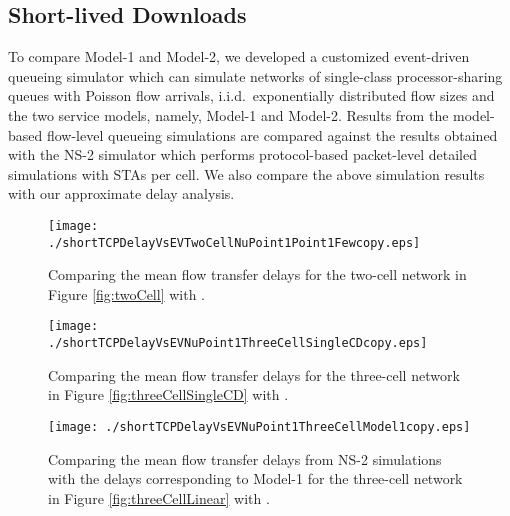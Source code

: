 \documentclass[10pt,a4paper,journal]{IEEEtran}
\theoremstyle{definition}
\theoremstyle{remark}
\theoremstyle{plain}
\begin{document}
\subsection{Short-lived Downloads}
\label{subsec:results-TCP-short}

To compare Model-1 and Model-2, we developed a customized event-driven queueing simulator which can simulate networks of single-class processor-sharing queues with Poisson flow arrivals, i.i.d.~exponentially distributed flow sizes and the two service models, namely, Model-1 and Model-2. Results from the model-based flow-level queueing simulations are compared against the results obtained with the NS-2 simulator \cite{wanet.ns2} which performs protocol-based packet-level detailed simulations with  STAs per cell. We also compare the above simulation results with our approximate delay analysis. 


\begin{figure}[tb]
  \centering
  \begin{minipage}{8.25cm}
  \begin{center}
    \texttt{[image: ./shortTCPDelayVsEVTwoCellNuPoint1Point1Fewcopy.eps]}
     \caption{Comparing the mean flow transfer delays for the two-cell
       network in Figure \ref{fig:twoCell} with . \label{fig:shortTCPDelayVsEVTwoCellNuPoint1Point1Few}}
     \vspace{3mm}
  \end{center}
  \end{minipage}
\begin{minipage}{8.25cm}
  \begin{center}
    \texttt{[image: ./shortTCPDelayVsEVNuPoint1ThreeCellSingleCDcopy.eps]}
     \caption{Comparing the mean flow transfer delays for the
       three-cell network in Figure \ref{fig:threeCellSingleCD} with
       . \label{fig:shortTCPDelayVsEVNuPoint1ThreeCellSingleCD}}
     \vspace{3mm}
  \end{center}
  \end{minipage}
  \begin{minipage}{8.25cm}
    \begin{center}
      \texttt{[image: ./shortTCPDelayVsEVNuPoint1ThreeCellModel1copy.eps]}
     \caption{Comparing the mean flow transfer delays from
       NS-2 simulations with the delays corresponding to Model-1 for
       the three-cell network in Figure \ref{fig:threeCellLinear}
       with . \label{fig:shortTCPDelayVsEVNuPoint1ThreeCellLinearModel1}}
\end{center}
  \end{minipage}
\end{figure}
\end{document}
